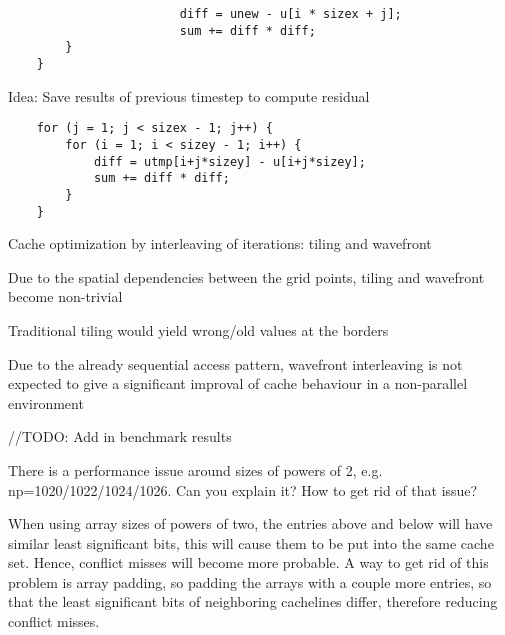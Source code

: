 \begin{frame}
\begin{lstlisting}
						diff = unew - u[i * sizex + j];
						sum += diff * diff;
		}
	}
\end{lstlisting}
\item Idea: Save results of previous timestep to compute residual
\begin{lstlisting}
	for (j = 1; j < sizex - 1; j++) {
		for (i = 1; i < sizey - 1; i++) {
			diff = utmp[i+j*sizey] - u[i+j*sizey];
			sum += diff * diff;
		}
	}
\end{lstlisting}

Cache optimization by interleaving of iterations: tiling and wavefront
\item Due to the spatial dependencies between the grid points, tiling and wavefront become non-trivial
\item Traditional tiling would yield wrong/old values at the borders
\item Due to the already sequential access pattern, wavefront interleaving is not expected to give a significant improval of cache behaviour in a non-parallel environment

//TODO: Add in benchmark results

 There is a performance issue around sizes of powers of 2, e.g. np=1020/1022/1024/1026. Can you explain it? How to get rid of that issue?
 
 When using array sizes of powers of two, the entries above and below will have similar least significant bits, this will cause them to be put into the same cache set. Hence, conflict misses will become more probable.
 A way to get rid of this problem is array padding, so padding the arrays with a couple more entries, so that the least significant bits of neighboring cachelines differ, therefore reducing conflict misses.
 


\end{frame}